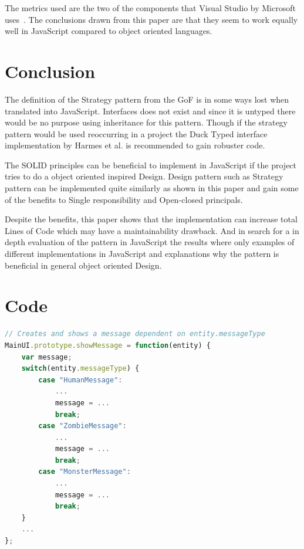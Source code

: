 \documentclass[conference, a4paper]{IEEEtran}
\begin{document}
The metrics used are the two of the components that Visual Studio by Microsoft uses~\cite{bibitem:MI}. The conclusions drawn from this paper are that they seem to work equally well in JavaScript compared to object oriented languages.

\section{Conclusion}
The definition of the Strategy pattern from the GoF is in some ways lost when translated into JavaScript. Interfaces does not exist and since it is untyped there would be no purpose using inheritance for this pattern. Though if the strategy pattern would be used reoccurring in a project the Duck Typed interface implementation by Harmes et al. is recommended to gain robuster code.~\cite{bibitem:DiazHarmes}

The SOLID principles can be beneficial to implement in JavaScript if the project tries to do a object oriented inspired Design. Design pattern such as Strategy pattern can be implemented quite similarly as shown in this paper and gain some of the benefits to Single responsibility and Open-closed principals.

Despite the benefits, this paper shows that the implementation can increase total Lines of Code which may have a maintainability drawback. And in search for a in depth evaluation of the pattern in JavaScript the results where only examples of different implementations in JavaScript and explanations why the pattern is beneficial in general object oriented Design.

\clearpage
\section*{Code}

\begin{lstlisting}[language=JavaScript, label=lst:switch-case, caption=\texttt{MainUI.js} The original switch case.]
// Creates and shows a message dependent on entity.messageType
MainUI.prototype.showMessage = function(entity) {
	var message;
	switch(entity.messageType) {
		case "HumanMessage":
			...
			message = ...
			break;
		case "ZombieMessage":
			...
			message = ...
			break;
		case "MonsterMessage":
			...
			message = ...
			break;
	}
	...
};
\end{lstlisting}
\end{document}
